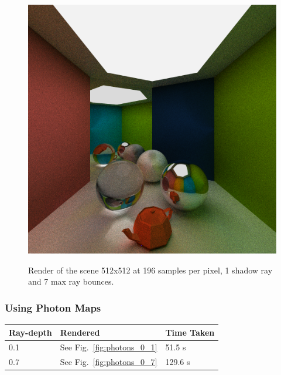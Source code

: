 \documentclass[a4paper, twocolumn]{article}
\begin{document}
            \begin{figure}[H]
                \centering
                \caption{Render of the scene 512x512 at 196 samples per pixel, 1 shadow ray and 7 max ray bounces.}
                \includegraphics[width=0.8\linewidth]{share/results/supersamples_196.png}
                \label{fig:supersamples_192}
            \end{figure}

            \subsubsection*{Using Photon Maps}

  \begin{table}[H]
            \centering
            \begin{tabular}{lll}
                \toprule
                \textbf{Ray-depth}&\textbf{Rendered}&\textbf{Time Taken}\\
                \midrule
                0.1&See Fig.~\ref{fig:photons_0_1}&51.5 s\\
                0.7&See Fig.~\ref{fig:photons_0_7}&129.6 s\\
                \bottomrule
            \end{tabular}
            \label{tab:depth_rays}
            \end{table}
\end{document}
